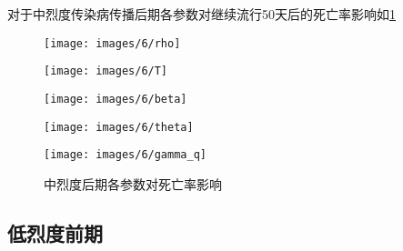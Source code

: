 \documentclass[withoutpreface,bwprint]{cumcmthesis}
\begin{document}
对于中烈度传染病传播后期各参数对继续流行50天后的死亡率影响如\cref{fig:11}
\begin{figure}[H]
    \centering
    \begin{minipage}[c]{0.3\textwidth}
        \centering
        \texttt{[image: images/6/rho]}
        \subcaption{$\rho$}
    \end{minipage}
    \begin{minipage}[c]{0.3\textwidth}
        \centering
        \texttt{[image: images/6/T]}
    \end{minipage}
    \begin{minipage}[c]{0.3\textwidth}
        \centering
        \texttt{[image: images/6/beta]}
        \subcaption{$\beta$}
    \end{minipage}

    \begin{minipage}[c]{0.3\textwidth}
        \centering
        \texttt{[image: images/6/theta]}
        \subcaption{$\theta$}
    \end{minipage}
    \begin{minipage}[c]{0.3\textwidth}
        \centering
        \texttt{[image: images/6/gamma\_q]}
    \end{minipage}
    \caption{中烈度后期各参数对死亡率影响}
    \label{fig:11}

\end{figure}

\subsection{低烈度前期}
\end{document}
